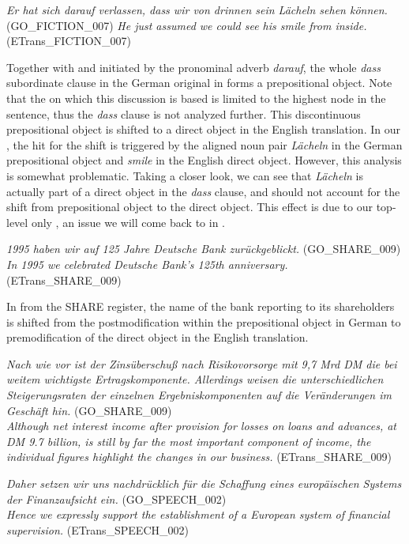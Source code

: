 \documentclass[output=paper]{LSP/langsci}
\begin{document}
\ea \label{ex:culo:19}
    \ea\label{ex:culo:verlassen} \textit{Er hat sich darauf verlassen, dass wir von drinnen sein Lächeln sehen können. }(GO\_FICTION\_007) 
    \ex \textit{He just assumed we could see his smile from inside.} (ETrans\_FICTION\_007) 
    \z
\z

Together with and initiated by the pronominal adverb \textit{darauf}, the whole \textit{dass }subordinate clause in the German original in  forms a prepositional object. Note that the  on which this discussion is based is limited to the highest node in the sentence, thus the \textit{dass} clause is not analyzed further. This discontinuous prepositional object is shifted to a direct object in the English translation. In our , the hit for the shift is triggered by the aligned noun pair \textit{Lächeln} in the German prepositional object and \textit{smile} in the English direct object. However, this analysis is somewhat problematic. Taking a closer look, we can see that \textit{Lächeln} is actually part of a direct object in the \textit{dass} clause, and should not account for the shift from prepositional object to the direct object. This effect is due to our top-level only , an issue we will come back to in .

\ea \label{ex:culo:20}
    \ea \textit{1995 haben wir auf 125 Jahre Deutsche Bank zurückgeblickt.} (GO\_SHARE\_009)\\
     \ex \textit{In 1995 we celebrated Deutsche Bank's 125th anniversary.} (ETrans\_SHARE\_009) 
     \z
\z
 
In  from the SHARE register, the name of the bank reporting to its shareholders is shifted from the postmodification within the prepositional object in German to premodification of the direct object in the English translation. 

\ea \label{ex:culo:21}
  \ea \textit{Nach wie vor ist der Zinsüberschuß nach Risikovorsorge mit 9,7 Mrd DM die bei   weitem wichtigste Ertragskomponente. Allerdings weisen die unterschiedlichen   Steigerungsraten der einzelnen Ergebniskomponenten auf die Veränderungen im Geschäft hin. } (GO\_SHARE\_009)\\
   \ex \textit{Although net interest income after provision for losses on loans and advances, at DM 9.7 billion, is still by far the most important component of income, the individual figures highlight the changes in our business.} (ETrans\_SHARE\_009) 
   \z
\z


\ea \label{ex:culo:22}
   \ea \textit{Daher setzen wir uns nachdrücklich für die Schaffung eines europäischen Systems der Finanzaufsicht ein.} (GO\_SPEECH\_002) \\
    \ex \textit{Hence we expressly support the establishment of a European system of financial   supervision.} (ETrans\_SPEECH\_002) 
    \z
\z
\end{document}
